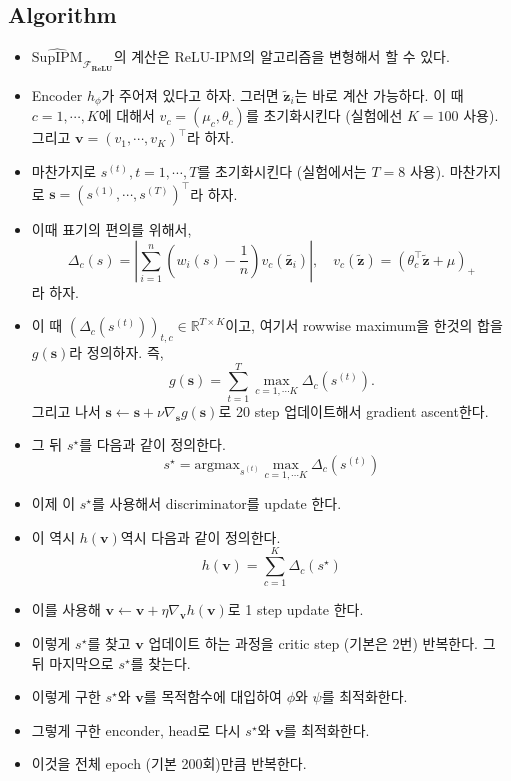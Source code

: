 \documentclass[10pt]{article}
\begin{document}
\subsection{Algorithm}
\begin{itemize}
    \item $ \widehat{\mathrm{SupIPM}}_{\mathcal{F}_{\mathbf{ReLU}}}$의 계산은 ReLU-IPM의 알고리즘을 변형해서 할 수 있다.
    
    \item Encoder $h_{\phi}$가 주어져 있다고 하자. 그러면 $\tilde{\mathbf{z}}_i$는 바로 계산 가능하다. 이 때 $c=1,\cdots,K$에 대해서 $v_{c} = (\mu_c, \theta_c)$를 초기화시킨다 (실험에선 $K=100$ 사용). 그리고 $\mathbf{v} = (v_1,\cdots, v_K)^{\top}$라 하자.
    \item 마찬가지로 $s^{(t)}, t=1,\cdots, T$를 초기화시킨다 (실험에서는 $T=8$ 사용). 마찬가지로 $\mathbf{s} = (s^{(1)}, \cdots, s^{(T)})^{\top}$라 하자.
    \item 이때 표기의 편의를 위해서,
    \begin{equation*}
        \Delta_{c}(s) =  |\sum_{i=1}^{n} \left(w_i(s) - \frac{1}{n} \right) 
        v_c(\tilde{\mathbf{z}_i}) |, \quad v_c(\tilde{\mathbf{z}}) = (\theta_{c}^{\top}\tilde{\mathbf{z}} + \mu )_{+}
    \end{equation*}
    라 하자.
    \item 이 때 $(\Delta_{c}(s^{(t)}))_{t,c} \in \mathbb{R}^{T \times K}$이고, 여기서 rowwise maximum을 한것의 합을 $g(\mathbf{s})$라 정의하자. 즉,
    \begin{equation*}
        g(\mathbf{s}) = \sum_{t=1}^{T} \max_{c=1,\cdots K}  \Delta_{c}( s^{(t)} ).
    \end{equation*}
    그리고 나서 $\mathbf{s} \leftarrow \mathbf{s} + \nu \nabla_{\mathbf{s}} g(\mathbf{s})$로 20 step 업데이트해서 gradient ascent한다.
    \item 그 뒤 $s^{\star}$를 다음과 같이 정의한다.
    \begin{equation*}
        s^{\star} = \mathrm{argmax}_{s^{(t)}}  \max_{c=1,\cdots K}  \Delta_{c}( s^{(t)} ) 
    \end{equation*}
    \item 이제 이 $s^{\star}$를 사용해서 discriminator를 update 한다.
    \item 이 역시 $h(\mathbf{v})$역시 다음과 같이 정의한다.
    \begin{equation*}
        h(\mathbf{v}) = \sum_{c=1}^{K} \Delta_{c}(s^{\star})
    \end{equation*}
    \item 이를 사용해 $\mathbf{v} \leftarrow \mathbf{v} + \eta \nabla_{\mathbf{v}} h(\mathbf{v})$로 1 step update 한다.
    \item 이렇게 $s^\star$를 찾고 $\mathbf{v}$ 업데이트 하는 과정을 critic step (기본은 2번) 반복한다. 그 뒤 마지막으로 $s^\star$를 찾는다.
    \item 이렇게 구한 $s^\star$와 $\mathbf{v}$를 목적함수에 대입하여 $\phi$와 $\psi$를 최적화한다.
    \item 그렇게 구한 enconder, head로 다시  $s^\star$와 $\mathbf{v}$를 최적화한다.
    \item 이것을 전체 epoch (기본 200회)만큼 반복한다.
\end{itemize}
\end{document}
